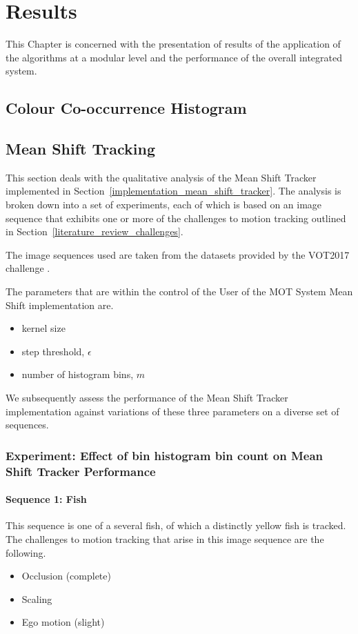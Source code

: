 \chapter{Results} \label{chapter_results}

This Chapter is concerned with the presentation of results of the application of
the algorithms at a modular level and the performance of the overall integrated system.

\section{Colour Co-occurrence Histogram}

\section{Mean Shift Tracking}
This section deals with the qualitative analysis of the Mean Shift Tracker
implemented in Section~\ref{implementation_mean_shift_tracker}. The analysis is
broken down into a set of experiments, each of which is based on an image
sequence that exhibits one or more of the challenges to motion tracking outlined
in Section~\ref{literature_review_challenges}. 

The image sequences used are taken from the datasets provided by the VOT2017
challenge \cite{VOT_TPAMI}.

The parameters that are within the control of the User of the MOT System Mean
Shift implementation are.
\begin{itemize}
    \item kernel size 
    \item step threshold, $\epsilon$
    \item number of histogram bins, $m$
\end{itemize}

We subsequently assess the performance of the Mean Shift Tracker implementation
against variations of these three parameters on a diverse set of sequences.
\subsection{Experiment: Effect of bin histogram bin count on Mean Shift Tracker Performance}
\subsubsection{Sequence 1: Fish}
This sequence is one of a several fish, of which a distinctly yellow fish is
tracked. The challenges to motion tracking that arise in this image sequence are the following.
\begin{itemize}
    \item Occlusion (complete)
    \item Scaling 
    \item Ego motion (slight) 
\end{itemize}

